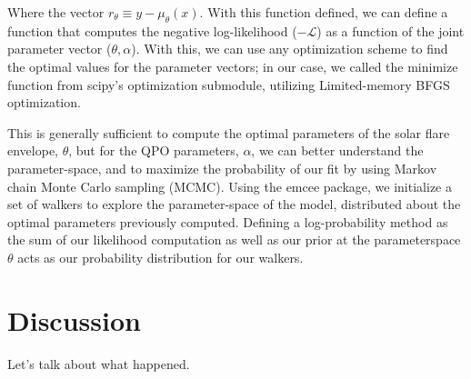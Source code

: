 \documentclass{aastex61}
\begin{document}
Where the vector $r_\theta \equiv y-\mu_\theta (x)$. With this function defined, we can define a function that computes the negative log-likelihood ($-\mathcal{L}$) as a function of the joint parameter vector ($\theta, \alpha$).
With this, we can use any optimization scheme to find the optimal values for the parameter vectors; in our case, we called the minimize function from scipy's optimization submodule, utilizing Limited-memory BFGS optimization.

This is generally sufficient to compute the optimal parameters of the solar flare envelope, $\theta$, but for the QPO parameters, $\alpha$, we can better understand the parameter-space, and to maximize the probability of our fit by using Markov chain Monte Carlo sampling (MCMC).
Using the emcee package, we initialize a set of walkers to explore the parameter-space of the model, distributed about the optimal parameters previously computed. Defining a log-probability method as the sum of our likelihood computation as well as our prior at the parameterspace $\theta$ acts as our probability distribution for our walkers.


\section{Discussion} \label{sec:discussion}
Let's talk about what happened.






\end{document}
